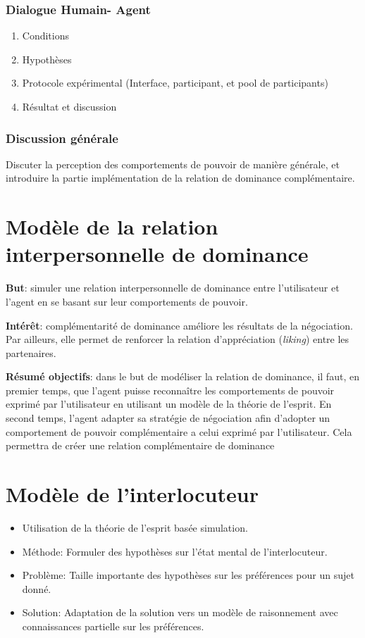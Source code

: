 \documentclass [french]{article}
\begin{document}
			\subsubsection{Dialogue Humain- Agent}
					\begin{enumerate}
						\item Conditions
						\item Hypothèses
						\item Protocole expérimental (Interface, participant, et pool de participants)
						\item Résultat et discussion 
					\end{enumerate}
					
			\subsubsection{Discussion générale}
					Discuter la perception des comportements de pouvoir de manière générale, et introduire la partie implémentation de la relation de dominance complémentaire.
	
	\section{Modèle de la relation interpersonnelle de dominance}
	\textbf{But}: simuler une relation interpersonnelle de dominance entre l'utilisateur et l'agent en se basant sur leur comportements de pouvoir. 
	
	\textbf{Intérêt}: complémentarité de dominance améliore les résultats de la négociation. Par ailleurs, elle permet de renforcer la relation d'appréciation (\emph{liking}) entre les partenaires.  
	
	\textbf{Résumé objectifs}: dans le but de modéliser la relation de dominance, il faut, en premier temps, que l'agent puisse reconnaître les comportements de pouvoir exprimé par l'utilisateur en utilisant un modèle de la théorie de l'esprit. En second temps, l'agent adapter sa stratégie de négociation afin d'adopter un comportement de pouvoir complémentaire a celui exprimé par l'utilisateur. Cela permettra de créer une relation complémentaire de dominance 
	
	\section{Modèle de l'interlocuteur}
		\begin{itemize}
			\item Utilisation de la théorie de l'esprit basée simulation. 
			\item Méthode: Formuler des hypothèses sur l'état mental de l'interlocuteur.
			\item Problème: Taille importante des hypothèses sur les préférences pour un sujet donné. 
			\item Solution: Adaptation de la solution vers un modèle de raisonnement avec connaissances partielle sur les préférences. 
		\end{itemize}
		
\end{document}
